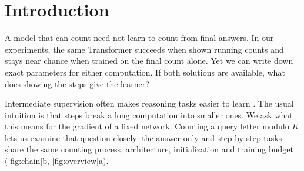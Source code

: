 \begin{abstract}
A Transformer can represent a counting algorithm and still struggle to learn it from final answers. On counting modulo a small number,
showing the running counts makes the task much easier to learn. We explain this gap through the information each training signal carries.
Every letter hidden from a feature contracts its correlation with the final count, while near initialization the Transformer's output is
dominated by features that read only a few letters. A displayed count exposes the next update directly. In a two-block Transformer that
holds exact solutions for both formats, outcome gradient flow from a zero readout stays near chance for a time exponential in the number
of letters. With a gate that reads the displayed count and the current letter, simultaneous gradient flow from small random magnitudes
along structured directions learns the supervised transitions after polynomial time. This holds for every modulus when match and
non-match probabilities differ; the proof supplies the routing and gate-readout direction. Experiments test what happens beyond these
restrictions: step supervision helps on counting, other state-tracking tasks, and LoRA-tuned Qwen2.5-0.5B on BIG-Bench Hard object
tracking. It does not help at every size, and one reversal remains unexplained.
\end{abstract}

\section{Introduction}
\label{sec:intro}

A model that can count need not learn to count from final answers. In our experiments, the same Transformer succeeds when shown
running counts and stays near chance when trained on the final count alone. Yet we can write down exact parameters for either
computation. If both solutions are available, what does showing the steps give the learner?

Intermediate supervision often makes reasoning tasks easier to learn \citep{nye2021scratchpads,wei2022cot,lightman2023verify}.
The usual intuition is that steps break a long computation into smaller ones. We ask what this means for the gradient of a fixed
network. Counting a query letter modulo $K$ lets us examine that question closely: the answer-only and step-by-step tasks share the
same counting process, architecture, initialization and training budget (\cref{fig:chain}b, \cref{fig:overview}a).

